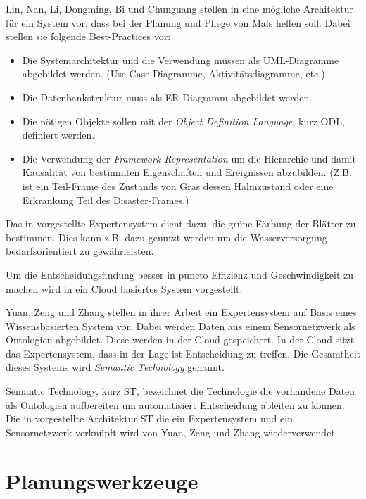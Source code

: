 Lin, Nan, Li, Dongming, Bi und Chunguang stellen in \cite{jour:Lin2013} eine mögliche Architektur für ein System vor, dass bei der Planung und Pflege von Mais helfen soll. Dabei stellen sie folgende Best-Practices vor: 


\begin{itemize}
	\item Die Systemarchitektur und die Verwendung müssen als UML-Diagramme abgebildet werden. (Use-Case-Diagramme, Aktivitätsdiagramme, etc.)
	\item Die Datenbankstruktur muss als ER-Diagramm abgebildet werden.
	\item Die nötigen Objekte sollen mit der \textit{Object Definition Language}, kurz ODL, definiert werden.
	\item Die Verwendung der \textit{Framework Representation} um die Hierarchie und damit Kausalität von bestimmten Eigenschaften und Ereignissen abzubilden. (Z.B. ist ein Teil-Frame des Zustands von Gras dessen Halmzustand oder eine Erkrankung Teil des Disaster-Frames.)
\end{itemize}

Das in \cite{jour:Romeo2013} vorgestellte Expertensystem dient dazu, die grüne Färbung der Blätter zu bestimmen. Dies kann z.B. dazu genutzt werden um die Wasserversorgung bedarfsorientiert zu gewährleisten.

Um die Entscheidungsfindung besser in puncto Effizienz und Geschwindigkeit zu machen wird in \cite{jour:Yuan2013} ein Cloud basiertes System vorgestellt. 

Yuan, Zeng und Zhang stellen in ihrer Arbeit ein Expertensystem auf Basis eines Wissensbasierten System vor. Dabei werden Daten aus einem Sensornetzwerk als Ontologien abgebildet. Diese werden in der Cloud gespeichert. In der Cloud sitzt das Expertensystem, dass in der Lage ist Entscheidung zu treffen. Die Gesamtheit dieses Systems wird \textit{Semantic Technology} genannt.\cite{jour:Yuan2013}

Semantic Technology, kurz ST, bezeichnet die Technologie die vorhandene Daten als  Ontologien aufbereiten um automatisiert Entscheidung ableiten zu können. Die in \cite{jour:Liu2012} vorgestellte Architektur ST die ein Expertensystem und ein Sensornetzwerk verknüpft wird von Yuan, Zeng und Zhang wiederverwendet.

\section{Planungswerkzeuge}

